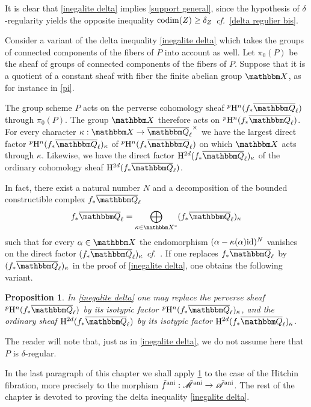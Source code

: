 \documentclass[12pt,english]{smfart}
\numberwithin{equation}{subsection}
\newtheorem{proposition}[equation]{Proposition}
\theoremstyle{remark}
\newcommand\calA{{\mathscr A}}
\newcommand\calM{{\mathscr M}}
\newcommand\QQ{{\mathbbm Q}}
\newcommand\rmH{{\rm H}}
\newcommand\bbX{{\mathbbm X}}
\newcommand\id{{\rm id}}
\newcommand\cf{{\it cf.\ }}
\newcommand\ani{{\rm ani}}
\newcommand\Ql{{\overline\QQ_\ell}}
\begin{document}
It is clear that \ref{inegalite delta} implies \ref{support general}, since the hypothesis of $\delta$-regularity yields the opposite inequality ${\rm codim}(Z)\geq \delta_Z$ \cf \ref{delta regulier bis}.

Consider a variant of the delta inequality \ref{inegalite delta} which takes the groups of connected components of the fibers of $P$ into account as well. Let $\pi_0(P)$ be the sheaf of groups of connected components of the fibers of $P$. Suppose that it is a quotient of a constant sheaf with fiber the finite abelian group $\bbX$, as for instance in \ref{pi}.

The group scheme $P$ acts on the perverse cohomology sheaf ${}^p\rmH^n(f_*\Ql)$ through $\pi_0(P)$. The group $\bbX$ therefore acts on ${}^p\rmH^n(f_*\Ql)$. For every character $\kappa:\bbX\rightarrow\Ql^\times$ we have the largest direct factor ${}^p\rmH^n(f_*\Ql)_\kappa$ of ${}^p\rmH^n(f_*\Ql)$ on which $\bbX$ acts through $\kappa$. Likewise, we have the direct factor $\rmH^{2d}(f_*\Ql)_\kappa$ of the ordinary cohomology sheaf $\rmH^{2d}(f_*\Ql)$.

In fact, there exist a natural number $N$ and a decomposition of the bounded constructible complex $f_*\Ql$
$$f_*\Ql=\bigoplus_{\kappa\in\bbX^*} (f_*\Ql)_\kappa$$
such that for every $\alpha\in\bbX$ the endomorphism $(\alpha-\kappa(\alpha)\id)^N$ vanishes on the direct factor $(f_*\Ql)_\kappa$ \cf \cite[3.2.5]{N}.
If one replaces $f_*\Ql$ by $(f_*\Ql)_\kappa$ in the proof of \ref{inegalite delta}, one obtains the following variant.

\begin{proposition}\label{support general kappa}
In \ref{inegalite delta} one may replace the perverse sheaf ${}^p\rmH^n(f_*\Ql)$ by its isotypic factor ${}^p\rmH^n(f_*\Ql)_\kappa$, and the ordinary sheaf $\rmH^{2d}(f_*\Ql)$ by its isotypic factor $\rmH^{2d}(f_*\Ql)_\kappa$.
\end{proposition}

The reader will note that, just as in \ref{inegalite delta}, we do not assume here that $P$ is $\delta$-regular.

In the last paragraph of this chapter we shall apply \ref{support general kappa} to the case of the Hitchin fibration, more precisely to the morphism $\tilde f^\ani:\tilde\calM^\ani\rightarrow\tilde\calA^\ani$. The rest of the chapter is devoted to proving the delta inequality \ref{inegalite delta}.

\end{document}
